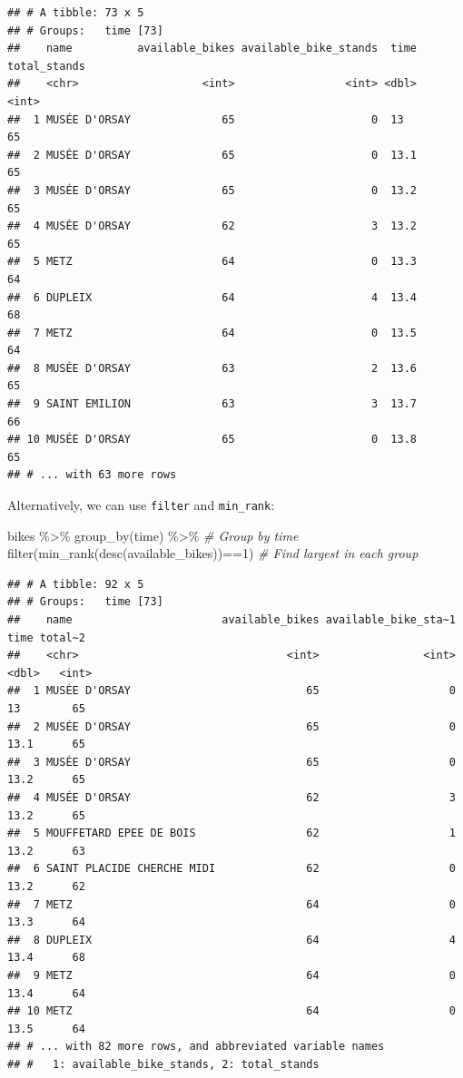 \documentclass[
]{book}
\newenvironment{Shaded}{\begin{snugshade}}{\end{snugshade}}
\newcommand{\CommentTok}[1]{\textcolor[rgb]{0.56,0.35,0.01}{\textit{#1}}}
\newcommand{\DecValTok}[1]{\textcolor[rgb]{0.00,0.00,0.81}{#1}}
\newcommand{\FunctionTok}[1]{\textcolor[rgb]{0.00,0.00,0.00}{#1}}
\newcommand{\NormalTok}[1]{#1}
\newcommand{\SpecialCharTok}[1]{\textcolor[rgb]{0.00,0.00,0.00}{#1}}
\begin{document}
\begin{verbatim}
## # A tibble: 73 x 5
## # Groups:   time [73]
##    name          available_bikes available_bike_stands  time total_stands
##    <chr>                   <int>                 <int> <dbl>        <int>
##  1 MUSÉE D'ORSAY              65                     0  13             65
##  2 MUSÉE D'ORSAY              65                     0  13.1           65
##  3 MUSÉE D'ORSAY              65                     0  13.2           65
##  4 MUSÉE D'ORSAY              62                     3  13.2           65
##  5 METZ                       64                     0  13.3           64
##  6 DUPLEIX                    64                     4  13.4           68
##  7 METZ                       64                     0  13.5           64
##  8 MUSÉE D'ORSAY              63                     2  13.6           65
##  9 SAINT EMILION              63                     3  13.7           66
## 10 MUSÉE D'ORSAY              65                     0  13.8           65
## # ... with 63 more rows
\end{verbatim}

Alternatively, we can use \texttt{filter} and \texttt{min\_rank}:

\begin{Shaded}
\begin{Highlighting}[]
\NormalTok{bikes }\SpecialCharTok{\%\textgreater{}\%}                                     
  \FunctionTok{group\_by}\NormalTok{(time) }\SpecialCharTok{\%\textgreater{}\%}                           \CommentTok{\# Group by time}
  \FunctionTok{filter}\NormalTok{(}\FunctionTok{min\_rank}\NormalTok{(}\FunctionTok{desc}\NormalTok{(available\_bikes))}\SpecialCharTok{==}\DecValTok{1}\NormalTok{)   }\CommentTok{\# Find largest in each group}
\end{Highlighting}
\end{Shaded}

\begin{verbatim}
## # A tibble: 92 x 5
## # Groups:   time [73]
##    name                       available_bikes available_bike_sta~1  time total~2
##    <chr>                                <int>                <int> <dbl>   <int>
##  1 MUSÉE D'ORSAY                           65                    0  13        65
##  2 MUSÉE D'ORSAY                           65                    0  13.1      65
##  3 MUSÉE D'ORSAY                           65                    0  13.2      65
##  4 MUSÉE D'ORSAY                           62                    3  13.2      65
##  5 MOUFFETARD EPEE DE BOIS                 62                    1  13.2      63
##  6 SAINT PLACIDE CHERCHE MIDI              62                    0  13.2      62
##  7 METZ                                    64                    0  13.3      64
##  8 DUPLEIX                                 64                    4  13.4      68
##  9 METZ                                    64                    0  13.4      64
## 10 METZ                                    64                    0  13.5      64
## # ... with 82 more rows, and abbreviated variable names
## #   1: available_bike_stands, 2: total_stands
\end{verbatim}
\end{document}
